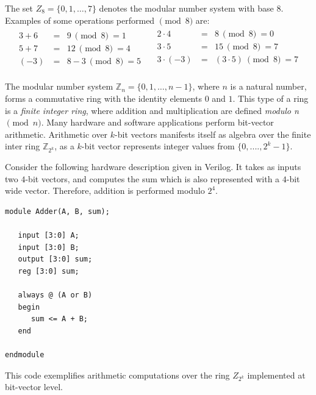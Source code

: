 \begin{Example}
The set $Z_8 = \{0, 1, \ldots, 7\}$ denotes the modular number system
with base $8$. Examples of some operations performed $\pmod {8}$
are:
\begin{eqnarray} \nonumber
    \begin{array}{rcrr} \nonumber
        3 + 6   &~=& 9  ~\pmod{8} ~= 1 \nonumber \\
        5 + 7   &~=& 12  ~\pmod{8} ~= 4 \nonumber \\
        (-3)    &~=& 8-3  ~\pmod{8} ~= 5 \nonumber
    \end{array} \nonumber
    \begin{array}{rcrr} \nonumber
        ~~~~~2 \cdot 4 &~=& 8  ~\pmod{8} ~= 0 \nonumber\\
        ~~~~~3 \cdot 5 &~=& 15 ~\pmod{8} ~= 7 \nonumber \\
        ~~~~~3 \cdot (-3) &~=& (3 \cdot 5) ~\pmod{8} ~= 7  \nonumber \\
    \end{array} \nonumber
\end{eqnarray} \nonumber
\end{Example}

The modular number system $\mathbb{Z}_n = \{0, 1, \ldots, n-1\}$, where $n$ is
a natural number, forms a commutative ring with the identity
elements $0$ and $1$. This type of a ring is a {\it finite integer
ring}, where addition and multiplication are defined {\it modulo n} $\pmod {n}$. 
Many hardware and software applications perform bit-vector
arithmetic. Arithmetic over $k$-bit vectors manifests itself as algebra
over the finite inter ring $\mathbb{Z}_{2^k}$, as a $k$-bit vector represents
integer values from $\{0, ...., 2^k - 1\}$.


\begin{Example}
\label{exp:4bitadder}
Consider the following hardware description given in Verilog. It takes
as inputs two $4$-bit vectors, and computes the sum which is also represented with a $4$-bit wide vector.
Therefore, addition is performed modulo $2^4$. 
\lstset{language=Verilog}
\begin{lstlisting}
module Adder(A, B, sum);

   input [3:0] A;
   input [3:0] B;
   output [3:0] sum;
   reg [3:0] sum;

   always @ (A or B)
   begin
      sum <= A + B;
   end

endmodule
\end{lstlisting}

This code exemplifies arithmetic computations over the ring $Z_{2^k}$ implemented at bit-vector level.
\end{Example}


